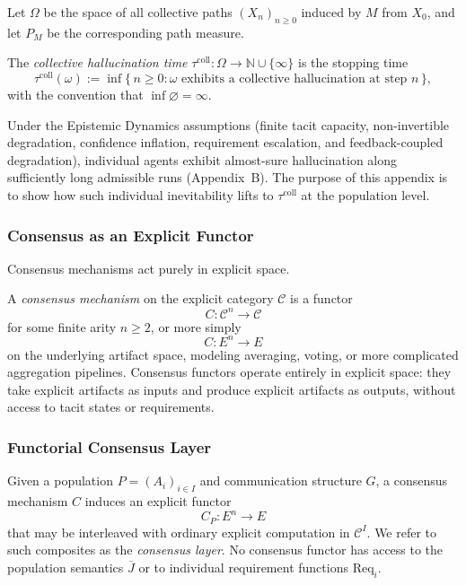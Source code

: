 Let $\Omega$ be the space of all collective paths $(X_n)_{n\ge 0}$ induced
by $M$ from $X_0$, and let $P_M$ be the corresponding path measure.

\begin{definition}
The \emph{collective hallucination time} $\tau^{\mathrm{coll}} :
\Omega \to \mathbb{N} \cup \{\infty\}$ is the stopping time
\[
  \tau^{\mathrm{coll}}(\omega)
  := \inf\{\,n \ge 0 : \omega \text{ exhibits a collective hallucination at step } n\,\},
\]
with the convention that $\inf \varnothing = \infty$.
\end{definition}

Under the Epistemic Dynamics assumptions (finite tacit capacity, non-invertible
degradation, confidence inflation, requirement escalation, and
feedback-coupled degradation), individual agents exhibit almost-sure
hallucination along sufficiently long admissible runs (Appendix~B).
The purpose of this appendix is to show how such individual inevitability
lifts to $\tau^{\mathrm{coll}}$ at the population level.

\subsubsection{Consensus as an Explicit Functor}

Consensus mechanisms act purely in explicit space.

\begin{definition}
A \emph{consensus mechanism} on the explicit category $\mathcal{C}$ is a
functor
\[
  C : \mathcal{C}^n \to \mathcal{C}
\]
for some finite arity $n \ge 2$, or more simply
\[
  C : E^n \to E
\]
on the underlying artifact space, modeling averaging, voting, or more
complicated aggregation pipelines. Consensus functors operate entirely in
explicit space: they take explicit artifacts as inputs and produce explicit
artifacts as outputs, without access to tacit states or requirements.
\end{definition}

\subsubsection{Functorial Consensus Layer}

Given a population $P=(A_i)_{i\in I}$ and communication structure $G$,
a consensus mechanism $C$ induces an explicit functor
\[
  C_P : E^n \to E
\]
that may be interleaved with ordinary explicit computation in
$\mathcal{C}^I$. We refer to such composites as the \emph{consensus layer}.
No consensus functor has access to the population semantics
$\overline{J}$ or to individual requirement functions $\mathrm{Req}_i$.

